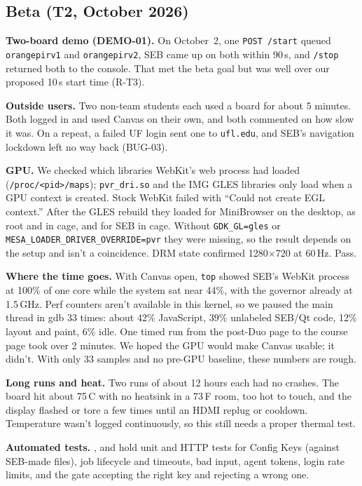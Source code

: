 \documentclass[11pt]{article}
\begin{document}
\subsection{Beta (T2, October 2026)}
\textbf{Two-board demo (DEMO-01).} On October~2, one \texttt{POST /start} queued \texttt{orangepirv1} and \texttt{orangepirv2}, SEB came up on both within 90\,s, and \texttt{/stop} returned both to the console. That met the beta goal but was well over our proposed 10\,s start time (R-T3).

\textbf{Outside users.} Two non-team students each used a board for about 5 minutes. Both logged in and used Canvas on their own, and both commented on how slow it was. On a repeat, a failed UF login sent one to \texttt{ufl.edu}, and SEB's navigation lockdown left no way back (BUG-03).

\textbf{GPU.} We checked which libraries WebKit's web process had loaded (\texttt{/proc/<pid>/maps}); \texttt{pvr\_dri.so} and the IMG GLES libraries only load when a GPU context is created. Stock WebKit failed with ``Could not create EGL context.'' After the GLES rebuild they loaded for MiniBrowser on the desktop, as root and in cage, and for SEB in cage. Without \texttt{GDK\_GL=gles} or \texttt{MESA\_LOADER\_DRIVER\_OVERRIDE=pvr} they were missing, so the result depends on the setup and isn't a coincidence. DRM state confirmed 1280$\times$720 at 60\,Hz. Pass.

\textbf{Where the time goes.} With Canvas open, \texttt{top} showed SEB's WebKit process at 100\% of one core while the system sat near 44\%, with the governor already at 1.5\,GHz. Perf counters aren't available in this kernel, so we paused the main thread in gdb 33 times: about 42\% JavaScript, 39\% unlabeled SEB/Qt code, 12\% layout and paint, 6\% idle. One timed run from the post-Duo page to the course page took over 2 minutes. We hoped the GPU would make Canvas usable; it didn't. With only 33 samples and no pre-GPU baseline, these numbers are rough.

\textbf{Long runs and heat.} Two runs of about 12 hours each had no crashes. The board hit about 75\,\textdegree C with no heatsink in a 73\,\textdegree F room, too hot to touch, and the display flashed or tore a few times until an HDMI replug or cooldown. Temperature wasn't logged continuously, so this still needs a proper thermal test.

\textbf{Automated tests.} ,  and  hold unit and HTTP tests for Config Keys (against SEB-made files), job lifecycle and timeouts, bad input, agent tokens, login rate limits, and the gate accepting the right key and rejecting a wrong one.
\end{document}
